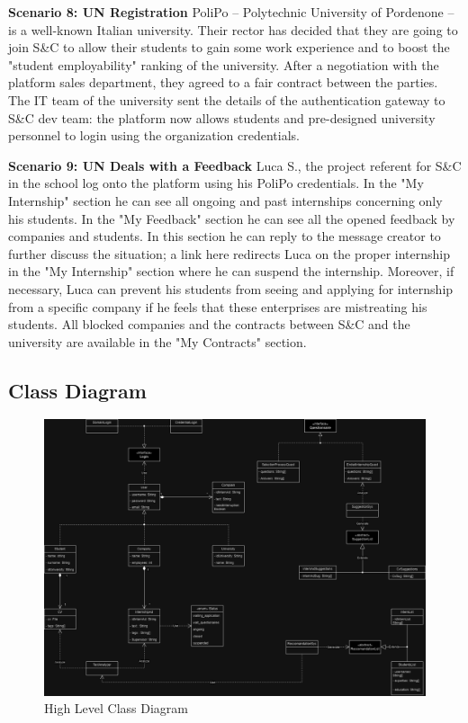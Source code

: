 \par{\textbf{Scenario 8: UN Registration}} PoliPo – Polytechnic University of Pordenone – is a well-known Italian
university. Their rector has decided that they are going to join S\&C to allow their students to gain some work
experience and to boost the "student employability" ranking of the university. After a negotiation with the platform
sales department, they agreed to a fair contract between the parties. The IT team of the university sent the details of
the authentication gateway to S\&C dev team: the platform now allows students and pre-designed university personnel to
login using the organization credentials.

\par{\textbf{Scenario 9: UN Deals with a Feedback}} Luca S., the project referent for S\&C in the school log onto the
platform using his PoliPo credentials. In the "My Internship" section he can see all ongoing and past internships
concerning only his students. In the "My Feedback" section he can see all the opened feedback by companies and
students. In this section he can reply to the message creator to further discuss the situation; a link here redirects
Luca on the proper internship in the "My Internship" section where he can suspend the internship.
Moreover, if necessary, Luca can prevent his students from seeing and applying for internship from a specific company
if he feels that these enterprises are mistreating his students. All blocked companies and the contracts between S\&C
and the university are available in the "My Contracts" section.


\subsection{Class Diagram}

\begin{figure}[H]
    \centering
    \includegraphics[width=1.0\textwidth]{Images/UML.png}
    \caption{High Level Class Diagram}
    \label{fig:class_diagram}
\end{figure}

